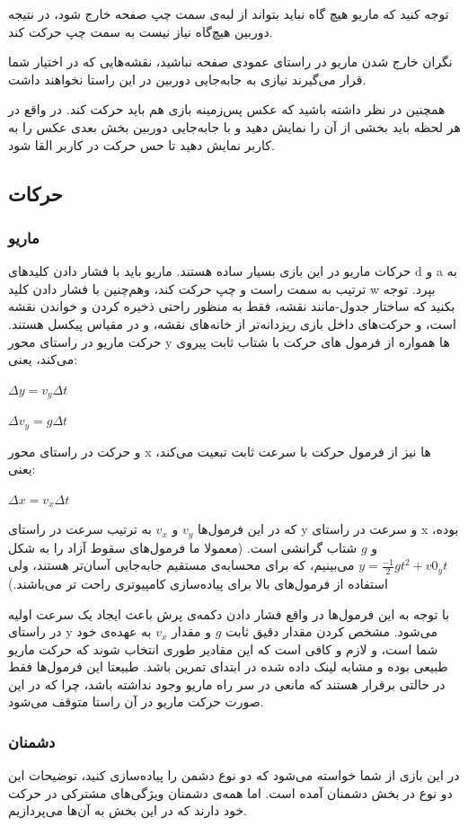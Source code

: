 \documentclass{utap}
\begin{document}
توجه کنید که ماریو هیچ گاه نباید بتواند از لبه‌ی سمت چپ صفحه خارج شود، در نتیجه دوربین هیچ‌گاه نیاز نیست به سمت چپ حرکت کند.

نگران خارج شدن ماریو در راستای عمودی صفحه نباشید، نقشه‌هایی که در اختیار شما قرار می‌گیرند نیازی به جابه‌جایی دوربین در این راستا نخواهند داشت.

همچنین در نظر داشته باشید که عکس پس‌زمینه بازی هم باید حرکت کند. در واقع در هر لحظه باید بخشی از آن را نمایش دهید و با جابه‌جایی دوربین بخش بعدی عکس را به کاربر نمایش دهید تا حس حرکت در کاربر القا شود.
	\subsection{حرکات}
		\subsubsection{ماریو}
حرکات ماریو در این بازی بسیار ساده هستند. ماریو باید با فشار دادن کلید‌های d و a به ترتیب به سمت راست و چپ حرکت کند، وهم‌چنین با فشار دادن کلید w بپرد. توجه بکنید که ساختار جدول-مانند نقشه، فقط به منظور راحتی ذخیره کردن و خواندن نقشه است، و حرکت‌های داخل بازی ریزدانه‌تر از خانه‌های نقشه، و در مقیاس پیکسل هستند. حرکت ماریو در راستای محور y ها همواره از فرمول های حرکت با شتاب ثابت پیروی می‌کند، یعنی:
	\begin{center}
		$\Delta y = v_y \Delta t$

		$\Delta v_y = g \Delta t$
	\end{center}
و حرکت در راستای محور x ها نیز از فرمول حرکت با سرعت ثابت تبعیت می‌کند، یعنی:
	\begin{center}
		$\Delta x = v_x \Delta t$
	\end{center}
که در این فرمول‌ها $v_y$ و $v_x$ به ترتیب سرعت در راستای y و سرعت در راستای x بوده، و $g$ شتاب گرانشی است. (معمولا ما فرمول‌های سقوط آزاد را به شکل
$y = \frac{-1}{2}gt^2 + v0_y t$
می‌بینیم، که برای محسابه‌ی مستقیم جابه‌جایی آسان‌تر هستند، ولی استفاده از فرمول‌های بالا برای پیاده‌سازی کامپیوتری راحت تر می‌باشند.) 

با توجه به این فرمول‌ها در واقع فشار دادن دکمه‌ی پرش باعث ایجاد یک سرعت اولیه در راستای‌ y می‌شود. مشخص کردن مقدار دقیق ثابت $g$ و مقدار $v_x$ به عهده‌ی خود شما است، و لازم و کافی است که این مقادیر طوری انتخاب شوند که حرکت ماریو طبیعی بوده و مشابه لینک داده شده در ابتدای تمرین باشد. طبیعتا این فرمول‌ها فقط در حالتی برقرار هستند که مانعی در سر راه ماریو وجود نداشته باشد، چرا که در این صورت حرکت ماریو در آن راستا متوقف می‌شود.
		\subsubsection{دشمنان}
در این بازی از شما خواسته می‌شود که دو نوع دشمن را پیاده‌سازی کنید، توضیحات این دو نوع در بخش دشمنان آمده است. اما همه‌ی دشمنان ویژگی‌های مشترکی در حرکت خود دارند که در این بخش به آن‌ها می‌پردازیم. 
\end{document}
